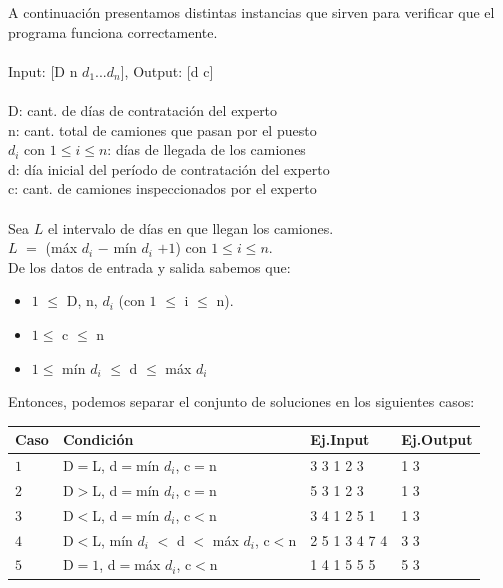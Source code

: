 \documentclass[11pt, a4paper, twoside]{article}
\begin{document}
A continuación presentamos distintas instancias que sirven para verificar que el programa funciona correctamente. \\ 
\\
Input: [D n $d_1$...$d_n$], Output: [d c] \\
\\
D: cant. de días de contratación del experto \\
n: cant.  total de camiones que pasan por el puesto \\
$d_i$ con $1 \le i \le n$: días de llegada de los camiones \\
d: día inicial del período de contratación del experto \\
c: cant. de camiones inspeccionados por el experto \\  
\\
Sea $L$ el intervalo de días en que llegan los camiones. \\
$L$ $=$ (máx $d_i$ $-$ mín $d_i$ $+ 1$) con $1 \le i \le n$. \\

De los datos de entrada y salida sabemos que: 

\begin{itemize}
    \item $1$ $\le$ D, n, $d_i$ (con $1$ $\le$ i $\le$ n).
  \item $1 \le $ c $\le$ n 
  \item $1 \le $ mín $d_i$ $\le$ d $\le$ máx $d_i$ 
\end{itemize}

Entonces, podemos separar el conjunto de soluciones en los siguientes casos: \\

\begin{tabular}{|l|l|l|l|}
  \hline
  Caso &  Condición                           & Ej.Input      & Ej.Output \\
  \hline
  $1$  &  D$=$L, d$=$mín $d_i$, c$=$n             & 3 3 1 2 3     & 1 3 \\  
  $2$  &  D$>$L, d$=$mín $d_i$, c$=$n               & 5 3 1 2 3     & 1 3 \\
  \hline  
  $3$  &  D$<$L, d$=$mín $d_i$, c$<$n             & 3 4 1 2 5 1   & 1 3 \\
  $4$  &  D$<$L, mín $d_i$ $<$ d $<$ máx $d_i$, c$<$n   & 2 5 1 3 4 7 4 & 3 3 \\
  $5$  &  D$=1$, d$=$máx $d_i$, c$<$n             & 1 4 1 5 5 5   & 5 3 \\  
  \hline
\end{tabular} \\
\end{document}
